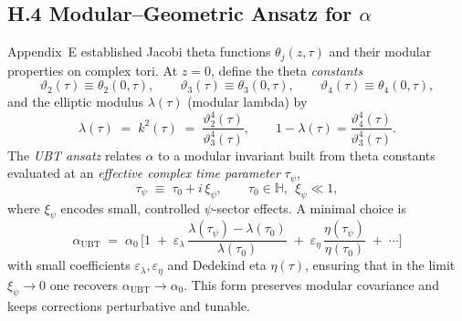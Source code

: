 \subsection*{H.4 Modular--Geometric Ansatz for $\alpha$}
Appendix~E established Jacobi theta functions $\theta_j(z,\tau)$ and their modular properties on complex tori. 
At $z=0$, define the theta \emph{constants}
\begin{equation}
\vartheta_2(\tau) \equiv \theta_2(0,\tau), \qquad
\vartheta_3(\tau) \equiv \theta_3(0,\tau), \qquad
\vartheta_4(\tau) \equiv \theta_4(0,\tau),
\end{equation}
and the elliptic modulus $\lambda(\tau)$ (modular lambda) by
\begin{equation}
\lambda(\tau) \;=\; k^2(\tau) \;=\; \frac{\vartheta_2^4(\tau)}{\vartheta_3^4(\tau)}, \qquad 1-\lambda(\tau)=\frac{\vartheta_4^4(\tau)}{\vartheta_3^4(\tau)}.
\end{equation}
The \emph{UBT ansatz} relates $\alpha$ to a modular invariant built from theta constants evaluated at an \emph{effective complex time parameter} $\tau_\psi$,
\begin{equation}
\tau_\psi \;\equiv\; \tau_0 + i\,\xi_\psi, \qquad \tau_0 \in \mathbb{H},\ \ \xi_\psi \ll 1,
\end{equation}
where $\xi_\psi$ encodes small, controlled $\psi$-sector effects. 
A minimal choice is
\begin{equation}
\boxed{\quad \alpha_{\mathrm{UBT}} \;=\; \alpha_0 \,\Bigg[ 1 \;+\; \varepsilon_\lambda\,
\frac{\lambda(\tau_\psi)-\lambda(\tau_0)}{\lambda(\tau_0)} \;+\; \varepsilon_\eta\,
\frac{\eta(\tau_\psi)}{\eta(\tau_0)} \;+\; \cdots \Bigg] \quad}
\label{eq:alpha_modular}
\end{equation}
with small coefficients $\varepsilon_{\lambda},\varepsilon_{\eta}$ and Dedekind eta $\eta(\tau)$, ensuring that in the limit $\xi_\psi \to 0$ one recovers $\alpha_{\mathrm{UBT}}\to \alpha_0$.
This form preserves modular covariance and keeps corrections perturbative and tunable.

